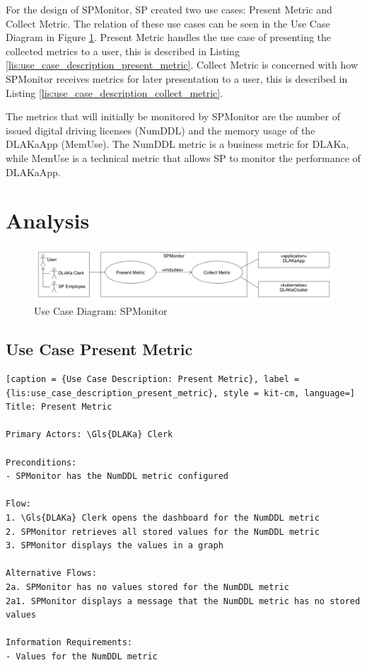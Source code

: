 For the design of SPMonitor, SP created two use cases: Present Metric and Collect Metric.
The relation of these use cases can be seen in the Use Case Diagram in Figure \ref{fig:use_case_monitoring_dlakaapp}.
Present Metric handles the use case of presenting the collected metrics to a user, this is described in Listing \ref{lis:use_case_description_present_metric}.
Collect Metric is concerned with how SPMonitor receives metrics for later presentation to a user, this is described in Listing \ref{lis:use_case_description_collect_metric}.

The metrics that will initially be monitored by SPMonitor are the number of issued digital driving licenses (NumDDL)
and the memory usage of the \Gls{DLAKaApp} (MemUse). The NumDDL metric is a business metric for DLAKa, while MemUse is
a technical metric that allows SP to monitor the performance of DLAKaApp.

\section{Analysis}


\begin{figure}
	\centering
	\includegraphics[width=\textwidth]{figures/2.1_use_case_spmonitor.png}
	\caption{Use Case Diagram: SPMonitor}
	\label{fig:use_case_monitoring_dlakaapp}
\end{figure}

\subsection{Use Case Present Metric}

\begin{lstlisting}[caption = {Use Case Description: Present Metric}, label = {lis:use_case_description_present_metric}, style = kit-cm, language=]
Title: Present Metric

Primary Actors: \Gls{DLAKa} Clerk

Preconditions:
- SPMonitor has the NumDDL metric configured

Flow:
1. \Gls{DLAKa} Clerk opens the dashboard for the NumDDL metric
2. SPMonitor retrieves all stored values for the NumDDL metric
3. SPMonitor displays the values in a graph

Alternative Flows:
2a. SPMonitor has no values stored for the NumDDL metric
2a1. SPMonitor displays a message that the NumDDL metric has no stored values

Information Requirements:
- Values for the NumDDL metric
\end{lstlisting}

